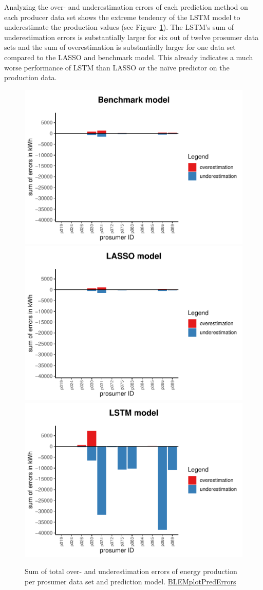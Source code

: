 Analyzing the over- and underestimation errors of each prediction method on each producer data set shows the extreme tendency of the LSTM model to underestimate the production values (see Figure~\ref{Fig:overunderestimation_p}). The LSTM's sum of underestimation errors is substantially larger for six out of twelve prosumer data sets and the sum of overestimation is substantially larger for one data set compared to the LASSO and benchmark model. This already indicates a much worse performance of LSTM than LASSO or the na\"ive predictor on the production data.
%
\begin{figure}
    \centering
    \includegraphics[width=.5\textwidth]{thesis/graphs/evaluation/p_barplot_naive_overunderestimation.pdf}\\\vspace{.6cm}
    \includegraphics[width=.5\textwidth]{thesis/graphs/evaluation/p_barplot_LASSO_overunderestimation.pdf}\\\vspace{.6cm}
    \includegraphics[width=.5\textwidth]{thesis/graphs/evaluation/p_barplot_LSTM_overunderestimation.pdf}
    \caption[Sum of total over- and underestimation errors per prosumer data set]{Sum of total over- and underestimation errors of energy production per prosumer data set and prediction model. \quantnet\href{https://github.com/QuantLet/BLEM/tree/master/BLEMplotPredErrors}{BLEMplotPredErrors}}
    \label{Fig:overunderestimation_p}
\end{figure}
%

